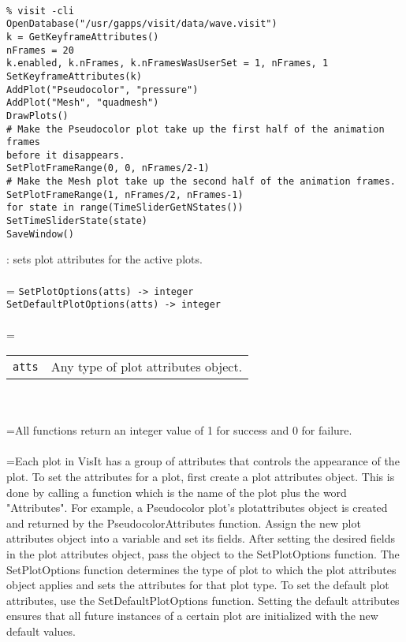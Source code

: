 \documentclass[10pt,a4paper]{report}
\begin{document}
\\[-6mm]
\begin{verbatim}% visit -cli
OpenDatabase("/usr/gapps/visit/data/wave.visit")
k = GetKeyframeAttributes()
nFrames = 20
k.enabled, k.nFrames, k.nFramesWasUserSet = 1, nFrames, 1
SetKeyframeAttributes(k)
AddPlot("Pseudocolor", "pressure")
AddPlot("Mesh", "quadmesh")
DrawPlots()
# Make the Pseudocolor plot take up the first half of the animation frames
before it disappears.
SetPlotFrameRange(0, 0, nFrames/2-1)
# Make the Mesh plot take up the second half of the animation frames.
SetPlotFrameRange(1, nFrames/2, nFrames-1)
for state in range(TimeSliderGetNStates())
SetTimeSliderState(state)
SaveWindow()
\end{verbatim}
\newpage


{}
: sets plot attributes for the active plots.\\[-3mm]

 \\ 
\hangindent=\parindent 
\verb!SetPlotOptions(atts) -> integer!\\ 
\verb!SetDefaultPlotOptions(atts) -> integer!\\ [-3mm]

 \\ 
\hangindent=\parindent 
\begin{tabular}{ll}
\verb!atts! & Any type of plot attributes object. \\
\end{tabular} \\[-2mm]


 \\ 
\hangindent=\parindent All functions return an integer value of 1 for success and 0 for failure. \\[-3mm] 

 \\ 
\hangindent=\parindent Each plot in VisIt has a group of attributes that controls the appearance of the plot. To set the attributes for a plot, first create a plot attributes object. This is done by calling a function which is the name of the plot plus the word "Attributes". For example, a Pseudocolor plot's plotattributes object is created and returned by the PseudocolorAttributes function. Assign the new plot attributes object into a variable and set its fields. After setting the desired fields in the plot attributes object, pass the object to the SetPlotOptions function. The SetPlotOptions function determines the type of plot to which the plot attributes object applies and sets the attributes for that plot type. To set the default plot attributes, use the SetDefaultPlotOptions function. Setting the default attributes ensures that all future instances of a certain plot are initialized with the new default values. \\[-3mm] 
\end{document}
